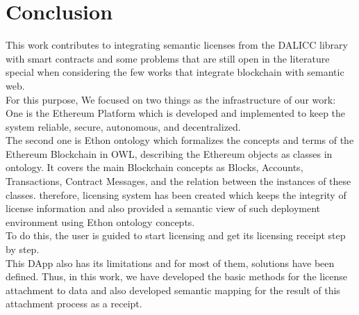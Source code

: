 \chapter{Conclusion}
This work contributes to integrating semantic licenses from the DALICC library with smart contracts and some problems that are still open in the literature special when considering the few works that integrate blockchain with semantic web.\\
 For this purpose, We focused on two things as the infrastructure of our work:\\
 One is the Ethereum Platform which is developed and implemented to keep the system reliable, secure, autonomous, and decentralized.\\
 The second one is Ethon ontology which formalizes the concepts and terms of the Ethereum Blockchain in OWL, describing the Ethereum objects as
classes in ontology. It covers the main Blockchain concepts as Blocks, Accounts, Transactions, Contract Messages, and the relation between the instances of these classes.
therefore, licensing system has been created which keeps the integrity of license information and also provided a semantic view of such deployment environment using Ethon ontology concepts.\\
To do this, the user is guided to start licensing and get its licensing receipt step by step. \\
This DApp also has its limitations and for most of them, solutions have been defined. Thus, in this work, we have developed the basic methods for the license attachment to data and also developed semantic mapping for the result of this attachment process as a receipt.

